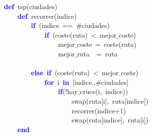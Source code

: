 \noindent
\mbox{}\textbf{\textcolor{Blue}{def}}\ tsp\textcolor{BrickRed}{(}ciudades\textcolor{BrickRed}{)} \\
\mbox{}\ \ \ \ \textbf{\textcolor{Blue}{def}}\ recorrer\textcolor{BrickRed}{(}indice\textcolor{BrickRed}{)} \\
\mbox{}\ \ \ \ \ \ \ \ \textbf{\textcolor{Blue}{if}}\ \textcolor{BrickRed}{(}indice\ \textcolor{BrickRed}{==}\ \#ciudades\textcolor{BrickRed}{)} \\
\mbox{}\ \ \ \ \ \ \ \ \ \ \ \ \textbf{\textcolor{Blue}{if}}\ \textcolor{BrickRed}{(}coste\textcolor{BrickRed}{(}ruta\textcolor{BrickRed}{)}\ \textcolor{BrickRed}{\textless{}}\ mejor$\_$coste\textcolor{BrickRed}{)} \\
\mbox{}\ \ \ \ \ \ \ \ \ \ \ \ \ \ \ \ mejor$\_$coste\ \textcolor{BrickRed}{=}\ coste\textcolor{BrickRed}{(}ruta\textcolor{BrickRed}{)} \\
\mbox{}\ \ \ \ \ \ \ \ \ \ \ \ \ \ \ \ mejor$\_$ruta\ \ \textcolor{BrickRed}{=}\ ruta \\
\mbox{} \\
\mbox{}\ \ \ \ \ \ \ \ \textbf{\textcolor{Blue}{else}}\ \textbf{\textcolor{Blue}{if}}\ \textcolor{BrickRed}{(}coste\textcolor{BrickRed}{(}ruta\textcolor{BrickRed}{)}\ \textcolor{BrickRed}{\textless{}}\ mejor$\_$coste\textcolor{BrickRed}{)} \\
\mbox{}\ \ \ \ \ \ \ \ \ \ \ \ \textbf{\textcolor{Blue}{for}}\ i\ \textbf{\textcolor{Blue}{in}}\ \textcolor{BrickRed}{[}indice\textcolor{BrickRed}{..}\#ciudades\textcolor{BrickRed}{]} \\
\mbox{}\ \ \ \ \ \ \ \ \ \ \ \ \ \ \ \ \textbf{\textcolor{Blue}{if}}\textcolor{BrickRed}{(!}hay$\_$cruce\textcolor{BrickRed}{(}i\textcolor{BrickRed}{,}\ indice\textcolor{BrickRed}{))} \\
\mbox{}\ \ \ \ \ \ \ \ \ \ \ \ \ \ \ \ \ \ \ \ swap\textcolor{BrickRed}{(}ruta\textcolor{BrickRed}{[}i\textcolor{BrickRed}{],}\ ruta\textcolor{BrickRed}{[}indice\textcolor{BrickRed}{])} \\
\mbox{}\ \ \ \ \ \ \ \ \ \ \ \ \ \ \ \ \ \ \ \ recorrer\textcolor{BrickRed}{(}indice\textcolor{BrickRed}{+}\textcolor{Purple}{1}\textcolor{BrickRed}{)} \\
\mbox{}\ \ \ \ \ \ \ \ \ \ \ \ \ \ \ \ \ \ \ \ swap\textcolor{BrickRed}{(}ruta\textcolor{BrickRed}{[}indice\textcolor{BrickRed}{],}\ ruta\textcolor{BrickRed}{[}i\textcolor{BrickRed}{])} \\
\mbox{}\ \ \ \ \textbf{\textcolor{Blue}{end}} \\
